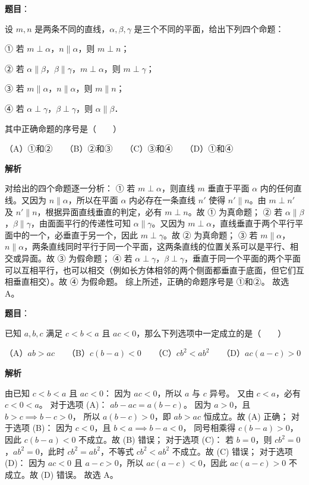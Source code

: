\begin{answer}

\textbf{题目}：

设 $m, n$ 是两条不同的直线，$\alpha, \beta, \gamma$ 是三个不同的平面，给出下列四个命题：

① 若 $m\perp\alpha$，$n\parallel\alpha$，则 $m\perp n$；

② 若 $\alpha\parallel\beta$，$\beta\parallel\gamma$，$m\perp\alpha$，则 $m\perp\gamma$；

③ 若 $m\parallel\alpha$，$n\parallel\alpha$，则 $m\parallel n$；

④ 若 $\alpha\perp\gamma$，$\beta\perp\gamma$，则 $\alpha\parallel\beta$．

其中正确命题的序号是\mbox{（　　）}

（A）①和②　　（B）②和③　　（C）③和④　　（D）①和④

\textbf{解析}

对给出的四个命题逐一分析：
① 若 $m\perp\alpha$，则直线 $m$ 垂直于平面 $\alpha$ 内的任何直线。又因为 $n\parallel\alpha$，所以在平面 $\alpha$ 内必存在一条直线 $n'$ 使得 $n'\parallel n$。由 $m\perp n'$ 及 $n'\parallel n$，根据异面直线垂直的判定，必有 $m\perp n$。故 ① 为真命题；
② 若 $\alpha\parallel\beta$，$\beta\parallel\gamma$，由面面平行的传递性可知 $\alpha\parallel\gamma$。又因为 $m\perp\alpha$，直线垂直于两个平行平面中的一个，必垂直于另一个，因此 $m\perp\gamma$。故 ② 为真命题；
③ 若 $m\parallel\alpha$，$n\parallel\alpha$，两条直线同时平行于同一个平面，这两条直线的位置关系可以是平行、相交或异面。故 ③ 为假命题；
④ 若 $\alpha\perp\gamma$，$\beta\perp\gamma$，垂直于同一个平面的两个平面可以互相平行，也可以相交（例如长方体相邻的两个侧面都垂直于底面，但它们互相垂直相交）。故 ④ 为假命题。
综上所述，正确的命题序号是 ①和②。
故选 A。


\end{answer}
\begin{answer}

\textbf{题目}：

已知 $a, b, c$ 满足 $c<b<a$ 且 $ac<0$，那么下列选项中一定成立的是\mbox{（　　）}

（A）$ab>ac$　　（B）$c(b-a)<0$　　（C）$cb^2<ab^2$　　（D）$ac(a-c)>0$

\textbf{解析}

由已知 $c<b<a$ 且 $ac<0$：
因为 $ac<0$，所以 $a$ 与 $c$ 异号。
又由 $c<a$，必有 $c<0<a$。
对于选项 (A)：
$ab-ac=a(b-c)$。
因为 $a>0$，且 $b>c\implies b-c>0$，
所以 $a(b-c)>0$，即 $ab>ac$ 恒成立。故 (A) 正确；
对于选项 (B)：
因为 $c<0$，且 $b<a\implies b-a<0$，
同号相乘得 $c(b-a)>0$，因此 $c(b-a)<0$ 不成立。故 (B) 错误；
对于选项 (C)：
若 $b=0$，则 $cb^2=0$，$ab^2=0$，此时 $cb^2=ab^2$，不等式 $cb^2<ab^2$ 不成立。故 (C) 错误；
对于选项 (D)：
因为 $ac<0$ 且 $a-c>0$，所以 $ac(a-c)<0$，因此 $ac(a-c)>0$ 不成立。故 (D) 错误。
故选 A。


\end{answer}
